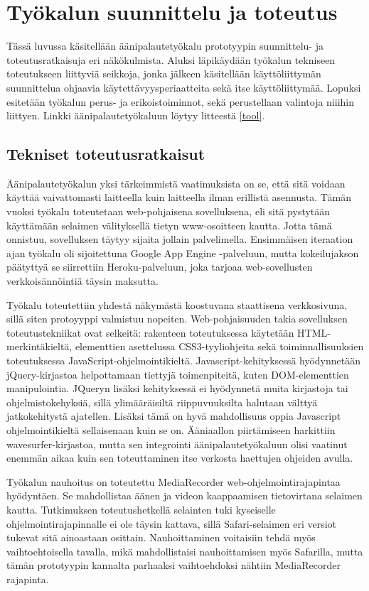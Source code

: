 \documentclass[utf8]{gradu3}
\begin{document}
\chapter{Työkalun suunnittelu ja toteutus}

Tässä luvussa käsitellään äänipalautetyökalu prototyypin suunnittelu- ja toteutusratkaisuja eri näkökulmista. Aluksi läpikäydään työkalun tekniseen toteutukseen liittyviä seikkoja, jonka jälkeen käsitellään käyttöliittymän suunnittelua ohjaavia käytettävyysperiaatteita sekä itse käyttöliittymää. Lopuksi esitetään työkalun perus- ja erikoistoiminnot, sekä perustellaan valintoja niiihin liittyen. Linkki äänipalautetyökaluun löytyy litteestä \ref{tool}.

\section{Tekniset toteutusratkaisut}

Äänipalautetyökalun yksi tärkeimmistä vaatimuksista on se, että sitä voidaan käyttää vaivattomasti laitteella kuin laitteella ilman erillistä asennusta. Tämän vuoksi työkalu toteutetaan web-pohjaisena sovelluksena, eli sitä pystytään käyttämään selaimen välityksellä tietyn www-osoitteen kautta. Jotta tämä onnistuu, sovelluksen täytyy sijaita jollain palvelimella. Ensimmäisen iteraation ajan työkalu oli sijoitettuna Google App Engine -palveluun, mutta kokeilujakson päätyttyä se siirrettiin Heroku-palveluun, joka tarjoaa web-sovellusten verkkoisännöintiä täysin maksutta. 

Työkalu toteutettiin yhdestä näkymästä koostuvana staattisena verkkosivuna, sillä siten protoyyppi valmistuu nopeiten. Web-pohjaisuuden takia sovelluksen toteutustekniikat ovat selkeitä: rakenteen toteutuksessa käytetään HTML-merkintäkieltä, elementtien asettelussa CSS3-tyyliohjeita sekä toiminnallisuuksien toteutuksessa JavaScript-ohjelmointikieltä. Javascript-kehityksessä hyödynnetään jQuery-kirjastoa helpottamaan tiettyjä toimenpiteitä, kuten DOM-elementtien manipulointia. JQueryn lisäksi kehityksessä ei hyödynnetä muita kirjastoja tai ohjelmistokehyksiä, sillä ylimääräisiltä riippuvuuksilta halutaan välttyä jatkokehitystä ajatellen. Lisäksi tämä on hyvä mahdollisuus oppia Javascript ohjelmointikieltä sellaisenaan kuin se on. Ääniaallon piirtämiseen harkittiin wavesurfer-kirjastoa, mutta sen integrointi äänipalautetyökaluun olisi vaatinut enemmän aikaa kuin sen toteuttaminen itse verkosta haettujen ohjeiden avulla.

Työkalun nauhoitus on toteutettu MediaRecorder web-ohjelmointirajapintaa hyödyntäen. Se mahdollistaa äänen ja videon kaappaamisen tietovirtana selaimen kautta. Tutkimuksen toteutushetkellä selainten tuki kyseiselle ohjelmointirajapinnalle ei ole täysin kattava, sillä Safari-selaimen eri versiot tukevat sitä ainoastaan osittain. Nauhoittaminen voitaisiin tehdä myös vaihtoehtoisella tavalla, mikä mahdollistaisi nauhoittamisen myös Safarilla, mutta tämän prototyypin kannalta parhaaksi vaihtoehdoksi nähtiin MediaRecorder rajapinta.
\end{document}
